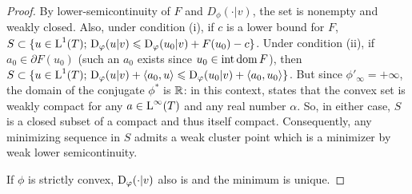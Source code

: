 \begin{proof}
 By lower-semicontinuity of $F$ and $D_\phi(\cdot|v)$, the set
is nonempty and weakly closed. 
%
Also, under condition (i), if $c$ is a lower bound for $F$, $S \subset \{ u \in \text{\upshape L}^1 (T); \,  \operatorname{D}_\varphi(u|v) \leqslant \operatorname{D}_\varphi(u_0|v) + F(u_0)-c\}$. Under condition (ii), if $a_0 \in \partial F(u_0)$ (such an $a_0$ exists since $u_0 \in \operatorname{int} \operatorname{dom} F$), then $S \subset \{ u \in \text{\upshape L}^1 (T); \,  \operatorname{D}_\varphi(u|v) + \langle a_0, u \rangle \leqslant \operatorname{D}_\varphi(u_0|v) + \langle a_0, u_0 \rangle \}$. 
%
But since $\phi'_\infty = +\infty$, the domain of the conjugate $\phi^*$ is $\mathbb{R}$: in this context, \cite[Corollary 4.1]{rockafellar1968integrals} states that the convex set
is weakly compact for any $a\in \text{\upshape L}^\infty (T)$ and any real number $\alpha$. So, in either case, $S$ is a closed subset of a compact and thus itself compact. Consequently, any minimizing sequence in $S$ admits a weak cluster point which is a minimizer by weak lower semicontinuity.

If $\phi$ is strictly convex, $\operatorname{D}_\varphi(\cdot| v)$ also is and the minimum is unique.
\end{proof}
\fi


